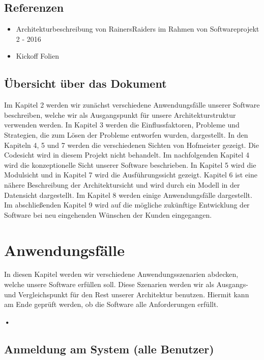 \documentclass[enabledeprecatedfontcommands,fontsize=12pt,paper=a4,twoside]{scrartcl}
\begin{document}
\subsection{Referenzen}
\begin{itemize}
  \item Architekturbeschreibung von RainersRaiders im Rahmen von Softwareprojekt 2 - 2016
  \item Kickoff Folien
\end{itemize}
\subsection{Übersicht über das Dokument}

{  Im Kapitel 2 werden wir zunächst verschiedene Anwendungsfälle unserer Software beschreiben, welche wir als Ausgangspunkt für unsere Architekturstruktur verwenden werden. In Kapitel 3 werden die Einflussfaktoren, Probleme und Strategien, die zum Lösen der Probleme entworfen wurden, dargestellt.
In den Kapiteln 4, 5 und 7 werden die verschiedenen Sichten von Hofmeister gezeigt. Die Codesicht wird in diesem Projekt nicht behandelt.
Im nachfolgenden Kapitel 4 wird die konzeptionelle Sicht unserer Software beschrieben. In Kapitel 5 wird die Modulsicht und in Kapitel 7 wird die Ausführungssicht gezeigt. Kapitel 6 ist eine nähere Beschreibung der Architektursicht und wird durch ein Modell in der Datensicht dargestellt.
Im Kapitel 8 werden einige Anwendungsfälle dargestellt. Im abschließenden Kapitel 9 wird auf die mögliche zukünftige Entwicklung der Software bei neu eingehenden Wünschen der Kunden eingegangen.

}



\section{Anwendungsfälle}

In diesen Kapitel werden wir verschiedene Anwendungsszenarien abdecken, welche unsere Software erfüllen soll. Diese Szenarien werden wir als Ausgangs- und Vergleichspunkt für den Rest unserer Architektur benutzen. Hiermit kann am Ende geprüft werden, ob die Software alle Anforderungen erfüllt. 

\textbf{•}\subsection{Anmeldung am System (alle Benutzer)}
\end{document}
